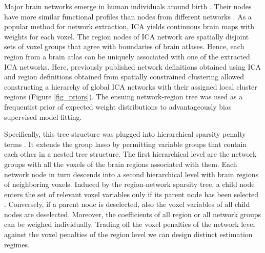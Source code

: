 \documentclass[runningheads,a4paper]{llncs}
\begin{document}
Major brain networks emerge in human individuals around birth
\cite{doria2010}.
Their nodes have more
similar functional profiles than nodes from different networks
\cite{anderson2013}.
As a popular method for network extraction,
ICA \cite{beckmann2005} yields continuous brain maps with
weights for each voxel. The region nodes of ICA
network are spatially disjoint sets of voxel groups that
agree with boundaries of brain atlases.
Hence,
each region from a brain atlas can be uniquely associated with one of
the extracted ICA networks.
%
Here, previously published network definitions
obtained using ICA \cite{smith2009}
and
region definitions obtained from
spatially constrained clustering \cite{crad12}
allowed constructing a hierarchy of global ICA networks with their
assigned local cluster regions
(Figure \ref{fig_priors}).
The ensuing network-region tree was used as a frequentist prior
of expected weight distributions
to advantageously bias supervised model fitting.

Specifically, this tree structure was plugged into
hierarchical sparsity penalty terms
\cite{jenatton2012multi}.
It extends the group lasso
\cite{yuan2006model}
by permitting variable groups that contain each other
in a nested tree structure.
The first hierarchical level are
the network groups with all
the voxels of the brain regions associated with them.
Each network node in turn descends into a second hierarchical level with
brain regions of neighboring voxels.
%
Induced by the region-network sparsity tree,
a child node enters the set of relevant voxel variables only
if its parent node has been selected
\cite{bach2012optimization}.
Conversely,
if a parent node is deselected,
also the voxel variables of all child nodes are deselected.
%
Moreover,
the coefficients of all region or all network groups can
be weighed individually.
Trading off the voxel penalties of the network level against the
voxel penalties of the region level
we can design distinct estimation regimes.
%
%
\end{document}
